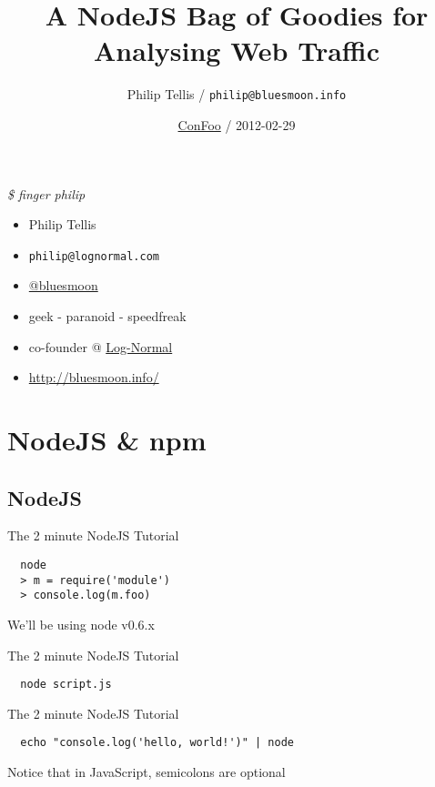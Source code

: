 \documentclass{beamer}
\author{Philip Tellis / \texttt{philip@bluesmoon.info}}
\title{A NodeJS Bag of Goodies for Analysing Web Traffic}
\date{\href{http://confoo.ca/}{ConFoo} / 2012-02-29}
\begin{document}
\begin{frame}
  \titlepage
\end{frame}


\begin{frame}{\textit{\$ finger philip}}
  \begin{itemize}
  \item Philip Tellis
  \item \small{\texttt{philip@lognormal.com}}
  \item \href{http://twitter.com/bluesmoon}{@bluesmoon}
  \item geek - paranoid - speedfreak
  \item co-founder @ \href{http://www.lognormal.com/}{Log-Normal}
  \item \href{http://bluesmoon.info/}{http://bluesmoon.info/}
  \end{itemize}
\end{frame}


\section{NodeJS \& npm}
\subsection{NodeJS}

\begin{frame}[fragile]{The 2 minute NodeJS Tutorial}
\begin{verbatim}
  node
  > m = require('module')
  > console.log(m.foo)
\end{verbatim}
We'll be using node v0.6.x
\end{frame}

\begin{frame}[fragile]{The 2 minute NodeJS Tutorial}
\begin{verbatim}
  node script.js
\end{verbatim}
\end{frame}

\begin{frame}[fragile]{The 2 minute NodeJS Tutorial}
\begin{verbatim}
  echo "console.log('hello, world!')" | node
\end{verbatim}
Notice that in JavaScript, semicolons are optional
\end{frame}
\end{document}
